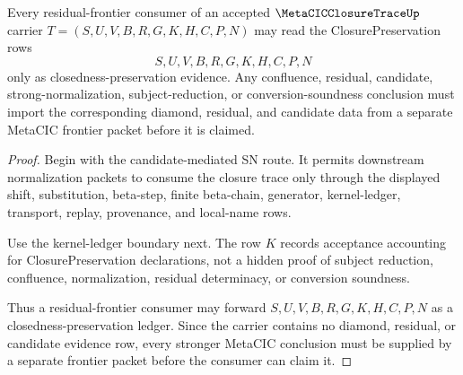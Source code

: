 \begin{theorem}
\label{thm:metacic-closure-trace-residual-frontier}
Every residual-frontier consumer of an accepted $\MetaCICClosureTraceUp$ carrier $T=(S,U,V,B,R,G,K,H,C,P,N)$ may read the ClosurePreservation rows
$$
S,U,V,B,R,G,K,H,C,P,N
$$
only as closedness-preservation evidence. Any confluence, residual, candidate, strong-normalization, subject-reduction, or conversion-soundness conclusion must import the corresponding diamond, residual, and candidate data from a separate MetaCIC frontier packet before it is claimed.
\end{theorem}
\begin{proof}
Begin with the candidate-mediated SN route. It permits downstream normalization packets to consume the closure trace only through the displayed shift, substitution, beta-step, finite beta-chain, generator, kernel-ledger, transport, replay, provenance, and local-name rows.

Use the kernel-ledger boundary next. The row $K$ records acceptance accounting for ClosurePreservation declarations, not a hidden proof of subject reduction, confluence, normalization, residual determinacy, or conversion soundness.

Thus a residual-frontier consumer may forward $S,U,V,B,R,G,K,H,C,P,N$ as a closedness-preservation ledger. Since the carrier contains no diamond, residual, or candidate evidence row, every stronger MetaCIC conclusion must be supplied by a separate frontier packet before the consumer can claim it.
\end{proof}


